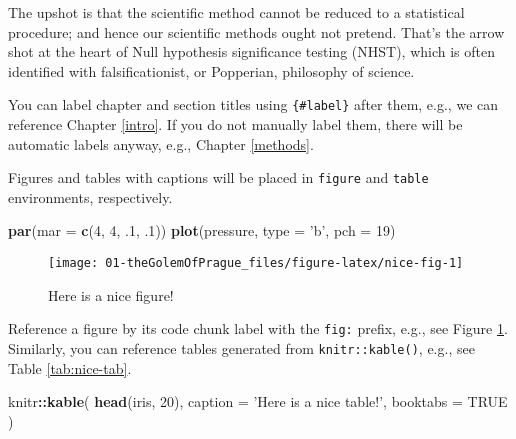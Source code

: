 \documentclass[
]{book}
\newenvironment{Shaded}{\begin{snugshade}}{\end{snugshade}}
\newcommand{\DataTypeTok}[1]{\textcolor[rgb]{0.13,0.29,0.53}{#1}}
\newcommand{\DecValTok}[1]{\textcolor[rgb]{0.00,0.00,0.81}{#1}}
\newcommand{\FloatTok}[1]{\textcolor[rgb]{0.00,0.00,0.81}{#1}}
\newcommand{\KeywordTok}[1]{\textcolor[rgb]{0.13,0.29,0.53}{\textbf{#1}}}
\newcommand{\NormalTok}[1]{#1}
\newcommand{\OperatorTok}[1]{\textcolor[rgb]{0.81,0.36,0.00}{\textbf{#1}}}
\newcommand{\OtherTok}[1]{\textcolor[rgb]{0.56,0.35,0.01}{#1}}
\newcommand{\StringTok}[1]{\textcolor[rgb]{0.31,0.60,0.02}{#1}}
\begin{document}
The upshot is that the scientific method cannot be reduced to a statistical procedure; and hence our scientific methods ought not pretend. That's the arrow shot at the heart of Null hypothesis significance testing (NHST), which is often identified with falsificationist, or Popperian, philosophy of science.

You can label chapter and section titles using \texttt{\{\#label\}} after them, e.g., we can reference Chapter \ref{intro}. If you do not manually label them, there will be automatic labels anyway, e.g., Chapter \ref{methods}.

Figures and tables with captions will be placed in \texttt{figure} and \texttt{table} environments, respectively.

\begin{Shaded}
\begin{Highlighting}[]
\KeywordTok{par}\NormalTok{(}\DataTypeTok{mar =} \KeywordTok{c}\NormalTok{(}\DecValTok{4}\NormalTok{, }\DecValTok{4}\NormalTok{, }\FloatTok{.1}\NormalTok{, }\FloatTok{.1}\NormalTok{))}
\KeywordTok{plot}\NormalTok{(pressure, }\DataTypeTok{type =} \StringTok{'b'}\NormalTok{, }\DataTypeTok{pch =} \DecValTok{19}\NormalTok{)}
\end{Highlighting}
\end{Shaded}

\begin{figure}

{\centering \texttt{[image: 01-theGolemOfPrague\_files/figure-latex/nice-fig-1]} 

}

\caption{Here is a nice figure!}\label{fig:nice-fig}
\end{figure}

Reference a figure by its code chunk label with the \texttt{fig:} prefix, e.g., see Figure \ref{fig:nice-fig}. Similarly, you can reference tables generated from \texttt{knitr::kable()}, e.g., see Table \ref{tab:nice-tab}.

\begin{Shaded}
\begin{Highlighting}[]
\NormalTok{knitr}\OperatorTok{::}\KeywordTok{kable}\NormalTok{(}
  \KeywordTok{head}\NormalTok{(iris, }\DecValTok{20}\NormalTok{), }\DataTypeTok{caption =} \StringTok{'Here is a nice table!'}\NormalTok{,}
  \DataTypeTok{booktabs =} \OtherTok{TRUE}
\NormalTok{)}
\end{Highlighting}
\end{Shaded}
\end{document}
